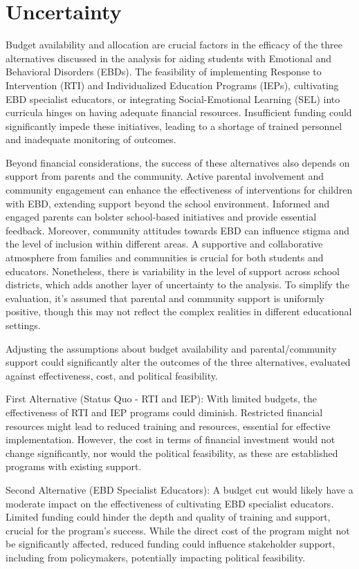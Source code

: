 \documentclass[11pt]{article}
\begin{document}
\section{Uncertainty}

Budget availability and allocation are crucial factors in the efficacy of the three alternatives discussed in the analysis for aiding students with Emotional and Behavioral Disorders (EBDs). The feasibility of implementing Response to Intervention (RTI) and Individualized Education Programs (IEPs), cultivating EBD specialist educators, or integrating Social-Emotional Learning (SEL) into curricula hinges on having adequate financial resources. Insufficient funding could significantly impede these initiatives, leading to a shortage of trained personnel and inadequate monitoring of outcomes.

Beyond financial considerations, the success of these alternatives also depends on support from parents and the community. Active parental involvement and community engagement can enhance the effectiveness of interventions for children with EBD, extending support beyond the school environment. Informed and engaged parents can bolster school-based initiatives and provide essential feedback. Moreover, community attitudes towards EBD can influence stigma and the level of inclusion within different areas. A supportive and collaborative atmosphere from families and communities is crucial for both students and educators. Nonetheless, there is variability in the level of support across school districts, which adds another layer of uncertainty to the analysis. To simplify the evaluation, it's assumed that parental and community support is uniformly positive, though this may not reflect the complex realities in different educational settings.

Adjusting the assumptions about budget availability and parental/community support could significantly alter the outcomes of the three alternatives, evaluated against effectiveness, cost, and political feasibility.

First Alternative (Status Quo - RTI and IEP): With limited budgets, the effectiveness of RTI and IEP programs could diminish. Restricted financial resources might lead to reduced training and resources, essential for effective implementation. However, the cost in terms of financial investment would not change significantly, nor would the political feasibility, as these are established programs with existing support.

Second Alternative (EBD Specialist Educators): A budget cut would likely have a moderate impact on the effectiveness of cultivating EBD specialist educators. Limited funding could hinder the depth and quality of training and support, crucial for the program's success. While the direct cost of the program might not be significantly affected, reduced funding could influence stakeholder support, including from policymakers, potentially impacting political feasibility.
\end{document}

